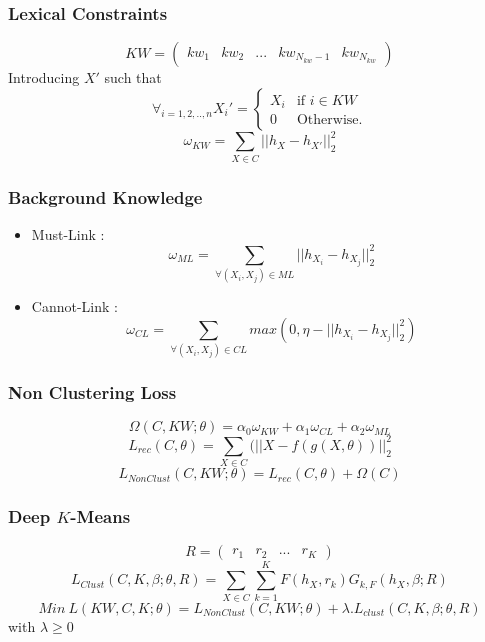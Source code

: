 \documentclass{beamer}
\begin{document}
\begin{frame}
\frametitle{Lexical Constraints}
\begin{equation*}
KW = \begin{pmatrix} kw_1 & kw_2 & ... & kw_{N_{kw}-1} & kw_{N_{kw}}
\end {pmatrix}
\end{equation*}
\pause
Introducing $X'$ such that
\begin{equation*}
\forall_{i=1,2,..,n}X_i' = \left\{
\begin{array}{ll}
  X_i & \mbox{if } i \in KW \\
  0 & \mbox{Otherwise.}
\end{array}
\right.
\end{equation*}
\pause
\begin{equation*}\label{eq:omega1}
  \omega_{KW} = \sum_{X \in C} || h_{X} - h_{X'}||_2^2
\end{equation*}
\end{frame}

\begin{frame}
\frametitle{Background Knowledge}
\pause
\begin{itemize}
\item Must-Link : $$\omega_{ML} = \sum_{\forall{(X_i,X_j)\in ML}} || h_{X_i} - h_{X_j} ||_2^2$$ \pause
\item Cannot-Link : $$\omega_{CL} = \sum_{\forall{(X_i,X_j)\in CL}} max(0,
  \eta - || h_{X_i} - h_{X_j} ||_2^2)$$
\end{itemize}
\end{frame}

\begin{frame}
\frametitle{Non Clustering Loss}
\begin{equation*}\label{eq:Sparse}
  \Omega(C, KW;\theta) = \alpha_0\omega_{KW} + \alpha_1\omega_{CL} + \alpha_2\omega_{ML}  
\end{equation*}
\pause
\begin{equation*}
  L_{rec}(C, \theta) = \sum_{X \in C}(||X - f(g(X, \theta))||_2^2
\end{equation*}
\pause
\begin{equation*}
  L_{NonClust}(C,KW; \theta) = L_{rec}(C, \theta) + \Omega(C)  
\end{equation*}

\end{frame}

\begin{frame}
\frametitle{Deep $K$-Means}
$$R = \begin{pmatrix} r_1 & r_2 & ... & r_K\end{pmatrix}$$
\pause
\begin{equation*}
  L_{Clust}(C, K, \beta; \theta, R) = \sum_{X \in C}\sum_{k=1}^K F(h_X, r_k) G_{k, F}(h_X, \beta; R) 
\end{equation*}
\pause
\begin{equation*}
  Min~L(KW, C, K; \theta) = L_{NonClust}(C, KW; \theta) + \lambda.L_{clust}(C, K, \beta; \theta, R)
\end{equation*}
with $\lambda \geq 0$
\end{frame}
\end{document}
